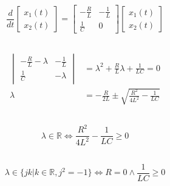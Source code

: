 \documentclass[]{article}
\newcommand{\diff}[1]{\frac{d}{d #1}}
\begin{document}
\subsection{}

\begin{equation}
	\diff{t}\begin{bmatrix}
	x_1(t) \\
	x_2(t)
	\end{bmatrix} =
	\begin{bmatrix}
	-\frac{R}{L} & -\frac{1}{L} \\
	\frac{1}{C} & 0
	\end{bmatrix}
	\begin{bmatrix}
	x_1(t) \\
	x_2(t)
	\end{bmatrix}
\end{equation}

\subsection{}

\begin{align}
	\begin{vmatrix}
	-\frac{R}{L} - \lambda & -\frac{1}{L} \\
	\frac{1}{C} & -\lambda
	\end{vmatrix} &= \lambda^2 + \frac{R}{L} \lambda + \frac{1}{LC} = 0 \\
	\lambda &= -\frac{R}{2L} \pm \sqrt{\frac{R^2}{4L^2} - \frac{1}{LC}}
\end{align}

\subsection{}

\begin{equation}
	\lambda \in \mathbb{R} \iff \frac{R^2}{4L^2} - \frac{1}{LC} \geqslant 0
\end{equation}

\subsection{}

\begin{equation}
	\lambda \in \{jk | k \in \mathbb{R}, j^2 = -1\} \iff R = 0 \wedge \frac{1}{LC} \geqslant 0
\end{equation}

\subsection{}
\end{document}
